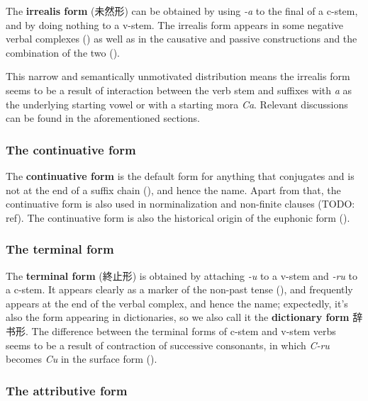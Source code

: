 \documentclass[UTF8, a4paper, oneside, scheme=plain]{ctexrep}
\newcommand*{\concept}[1]{\textbf{#1}}
\newcommand{\corpus}[1]{\emph{#1}}
\begin{document}
The \concept{irrealis form} (未然形) can be obtained by using \corpus{-a} to the final of a c-stem,
and by doing nothing to a v-stem.
The irrealis form appears in some negative verbal complexes ()
as well as in the causative and passive constructions 
and the combination of the two (). 

This narrow and semantically unmotivated distribution means 
the irrealis form seems to be a result of  
interaction between the verb stem and 
suffixes with \corpus{a} as the underlying starting vowel or with a starting mora \corpus{Ca}.
Relevant discussions can be found in the aforementioned sections.

\subsubsection{The continuative form}\label{sec:continuative-form}

The \concept{continuative form} is the default form for anything that conjugates
and is not at the end of a suffix chain (),
and hence the name.
Apart from that, the continuative form is also used in norminalization and non-finite clauses (TODO: ref).
The continuative form is also the historical origin of the euphonic form ().

\subsubsection{The terminal form}\label{sec:terminal-form}

The \concept{terminal form} (終止形) is obtained by attaching \corpus{-u} to a v-stem and \corpus{-ru} to a c-stem.
It appears clearly as a marker of the non-past tense (),
and frequently appears at the end of the verbal complex, and hence the name;
expectedly, it's also the form appearing in dictionaries,
so we also call it the \concept{dictionary form} 辞书形.
The difference between the terminal forms of c-stem and v-stem verbs 
seems to be a result of contraction of successive consonants,
in which \corpus{C-ru} becomes \corpus{Cu} in the surface form
().

\subsubsection{The attributive form}
\end{document}

